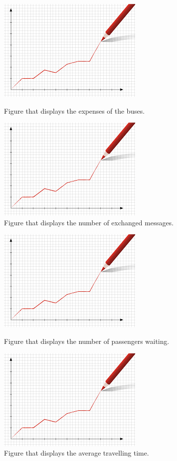 \begin{figure}[htbp]
\centering
\begin{minipage}{.48\textwidth}
  \includegraphics[width=.4\textwidth]{src/expenses.jpg}
  \caption{\label{fig:expense}Figure that displays the expenses of the buses.}
\end{minipage}%
\begin{minipage}{.48\textwidth}
  \includegraphics[width=.4\textwidth]{src/nr_messages.jpg}
  \caption{\label{fig:messages}Figure that displays the number of exchanged messages.}
\end{minipage}
\end{figure}

\begin{figure}[htbp]
\centering
\begin{minipage}{.48\textwidth}
  \includegraphics[width=.4\linewidth]{src/nr_pass_waiting.jpg}
  \caption{\label{fig:pass_waiting}Figure that displays the number of passengers waiting.}
\end{minipage}%
\begin{minipage}{.48\textwidth}
  \includegraphics[width=.4\linewidth]{src/avg_tt.jpg}
  \caption{\label{fig:avg_tt}Figure that displays the average travelling time.}
\end{minipage}
\end{figure}
